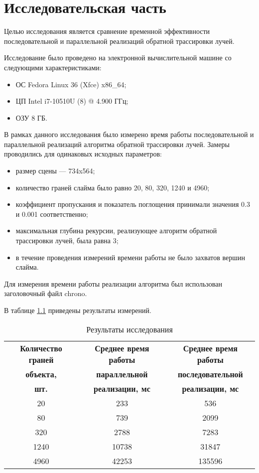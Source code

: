 \chapter{Исследовательская часть}

Целью исследования является сравнение временной эффективности последовательной и параллельной реализаций обратной трассировки лучей.

Исследование было проведено на электронной вычислительной машине со следующими характеристиками:

\begin{itemize}
	\item ОС Fedora Linux 36 (Xfce) x86\_64;
	\item ЦП Intel i7-10510U (8) @ 4.900 ГГц;
	\item ОЗУ 8 ГБ.
\end{itemize}

В рамках данного исследования было измерено время работы последовательной и параллельной реализаций алгоритма обратной трассировки лучей. Замеры проводились для одинаковых исходных параметров:
\begin{itemize}
	\item размер сцены --- 734x564;
	
	\item количество граней слайма было равно 20, 80, 320, 1240 и 4960;
	
	\item коэффициент пропускания и показатель поглощения принимали значения 0.3 и 0.001 соответственно;
	
	\item максимальная глубина рекурсии, реализующее алгоритм обратной трассировки лучей, была равна 3;
	
	\item в течение проведения измерений времени работы не было захватов вершин слайма.
\end{itemize}

Для измерения времени работы реализации алгоритма был использован заголовочный файл chrono.

В таблице \ref{restable} приведены результаты измерений.

\begin{table}[H]
	\begin{center}
		\caption{\label{restable}Результаты исследования}
		\begin{tabular}{|c|c|c|}
			\hline
			\bf{Количество граней} & \bf{Среднее время работы} & \bf{Среднее время работы}\\
			\bf{объекта,} & \bf{параллельной} & \bf{последовательной}\\
			\bf{шт.} & \bf{реализации, мс} & \bf{реализации, мс}\\
			\hline
			20 & 233 & 536\\
			\hline
			80 & 739 & 2099\\
			\hline
			320 & 2788 & 7283\\
			\hline
			1240 & 10738 & 31847\\
			\hline
			4960 & 42253 & 135596\\
			\hline
		\end{tabular}
	\end{center}
\end{table}

